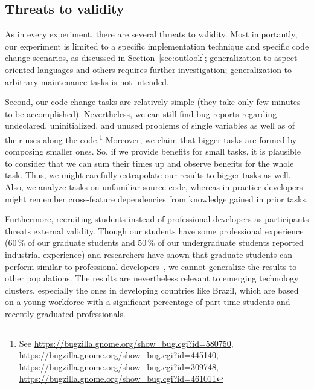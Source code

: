 \subsection{Threats to validity}

As in every experiment, there are several threats to validity. 
Most importantly, our experiment is limited to a specific implementation technique and specific code change scenarios, as discussed in Section~\ref{sec:outlook}; generalization to aspect-oriented languages and others requires further investigation; generalization to arbitrary maintenance tasks is not intended.

Second, our code change tasks are relatively simple (they take only few minutes to be accomplished). Nevertheless, we can still find bug reports regarding undeclared, uninitialized, and unused problems of single variables as well as of their uses along the code.\footnote{See \url{https://bugzilla.gnome.org/show_bug.cgi?id=580750}, \url{https://bugzilla.gnome.org/show_bug.cgi?id=445140}, \url{https://bugzilla.gnome.org/show_bug.cgi?id=309748}, \url{https://bugzilla.gnome.org/show_bug.cgi?id=461011}} Moreover, we claim that bigger tasks are formed by composing smaller ones. So, if we provide benefits for small tasks, it is plausible to consider that we can sum their times up and observe benefits for the whole task. Thus, we might carefully extrapolate our results to bigger tasks as well. Also, we analyze tasks on unfamiliar source code, whereas in practice developers might remember cross-feature dependencies from knowledge gained in prior tasks. 



Furthermore, recruiting students instead of professional developers as participants threats external validity. Though our students have some professional experience (60\,\% of our graduate students and 50\,\% of our undergraduate students reported industrial experience) and researchers have shown that graduate students can perform similar to professional developers~\cite{buse-students-experiments-sigplan-11}, we cannot generalize the results to other populations. The results are nevertheless relevant to emerging technology clusters, especially the ones in developing countries like Brazil, which are based on a young workforce with a significant percentage of part time students and recently graduated professionals.




